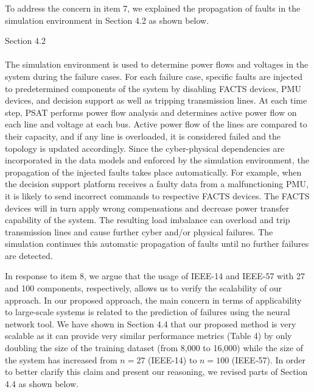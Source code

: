 \documentclass{article}
\newenvironment{response}{
  \doublespacing
  \setlength\parindent{0.05\linewidth}
  \ttfamily
}{}
\newenvironment{textblock}[1]
{\begin{tcolorbox}[breakable,enhanced]{#1 \\ \\}}
{\end{tcolorbox}}
\begin{document}
\begin{response}
To address the concern in item 7, we explained the propagation of faults in the simulation environment in Section 4.2 as shown below.

\begin{textblock}{Section 4.2}
The simulation environment is used to determine power flows and voltages in the system during the failure cases. For each failure case, specific faults are injected to predetermined components of the system by disabling FACTS devices, PMU devices, and decision support as well as tripping transmission lines. At each time step, PSAT performs power flow analysis and determines active power flow on each line and voltage at each bus. Active power flow of the lines are compared to their capacity, and if any line is overloaded, it is considered failed and the topology is updated accordingly. Since the cyber-physical dependencies are incorporated in the data models and enforced by the simulation environment, the propagation of the injected faults takes place automatically. For example, when the decision support platform receives a faulty data from a malfunctioning PMU, it is likely to send incorrect commands to respective FACTS devices. The FACTS devices will in turn apply wrong compensations and decrease power transfer capability of the system. The resulting load imbalance can overload and trip transmission lines and cause further cyber and/or physical failures. The simulation continues this automatic propagation of faults until no further failures are detected.
\end{textblock}

In response to item 8, we argue that the usage of IEEE-14 and IEEE-57 with 27 and 100 components, respectively, allows us to verify the scalability of our approach. In our proposed approach, the main concern in terms of applicability to large-scale systems is related to the prediction of failures using the neural network tool. We have shown in Section 4.4 that our proposed method is very scalable as it can provide very similar performance metrics (Table 4) by only doubling the size of the training dataset (from 8,000 to 16,000) while the size of the system has increased from $n = 27$ (IEEE-14) to $n = 100$ (IEEE-57). In order to better clarify this claim and present our reasoning, we revised parts of Section 4.4 as shown below.


\end{response}
\end{document}
